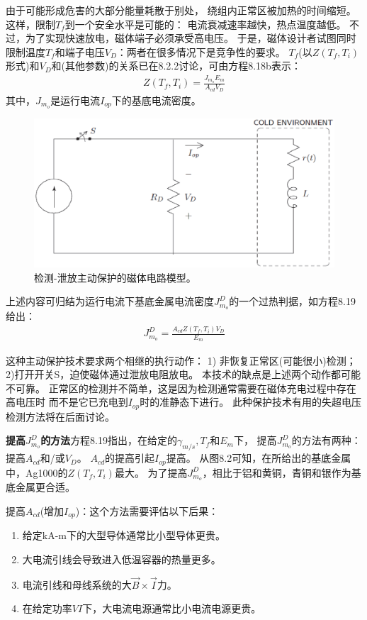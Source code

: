 由于可能形成危害的大部分能量耗散于别处，
绕组内正常区被加热的时间缩短。这样，限制$T_f$到一个安全水平是可能的：
电流衰减速率越快，热点温度越低。
不过，为了实现快速放电，磁体端子必须承受高电压。
于是，磁体设计者试图同时限制温度$T_f$和端子电压$V_D$：两者在很多情况下是竞争性的要求。
$T_f$(以$Z(T_f,T_i)$形式)和$V_D$和(其他参数)的关系已在8.2.2讨论，可由方程8.18b表示：
\begin{align*}%
Z(T_f,T_i)=\frac{J_{m_o}E_m}{A_{cd}V_D}\tag{8.18b}
\end{align*}
其中，$J_{m_o}$是运行电流$I_{op}$下的基底电流密度。

\begin{figure}
	\centering
	\includegraphics[scale=0.5]{chpt8/figs/fig8.17.eps}
	\caption{检测-泄放主动保护的磁体电路模型。}
\end{figure}

上述内容可归结为运行电流下基底金属电流密度$J_{m_o}^D$的一个过热判据，如方程8.19给出：
\begin{align*}%
J_{m_o}^{D}=\frac{A_{cd}Z(T_f,T_i)V_D}{E_m}\tag{8.19}
\end{align*}

这种主动保护技术要求两个相继的执行动作：
1) 非恢复正常区(可能很小)检测；2)打开开关S，迫使磁体通过泄放电阻放电。
本技术的缺点是上述两个动作都可能不可靠。
正常区的检测并不简单，这是因为检测通常需要在磁体充电过程中存在高电压时
而不是它已充电到$I_{op}$时的准静态下进行。
此种保护技术有用的失超电压检测方法将在后面讨论。

\textbf{提高$J_{m_o}^D$的方法}\quad 方程8.19指出，在给定的$\gamma_{m/s}, T_f$和$E_m$下，
提高$J_{m_o}^D$的方法有两种：提高$A_{cd}$和/或$V_D$。
$A_{cd}$的提高引起$I_{op}$提高。
从图8.2可知，在所给出的基底金属中，Ag1000的$Z(T_f,T_i)$最大。
为了提高$J_{m_o}^D$，相比于铝和黄铜，青铜和银作为基底金属更合适。

提高$A_{cd}$(增加$I_{op}$)：这个方法需要评估以下后果：
\begin{enumerate}
	\item 给定kA-m下的大型导体通常比小型导体更贵。
	\item 大电流引线会导致进入低温容器的热量更多。
	\item 电流引线和母线系统的大$\vec{B}\times \vec{I}$力。
	\item 在给定功率$VI$下，大电流电源通常比小电流电源更贵。	
\end{enumerate}

